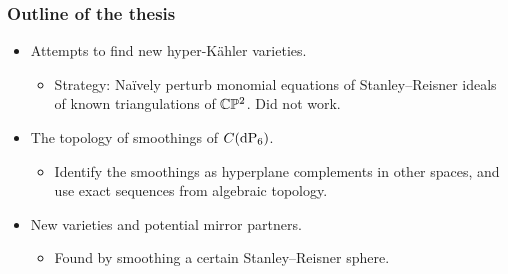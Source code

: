\begin{frame}
\frametitle{Outline of the thesis}

\begin{itemize}
    \item<1->
    Attempts to find new hyper-Kähler varieties.
    \begin{itemize}
        \item
	Strategy: Naïvely perturb monomial equations of Stanley--Reisner ideals of known triangulations of $\mathbb{C} \mathbb{P}^2$. \alert{Did not work.}
    \end{itemize}

    \item<2->
    The topology of smoothings of $C(\dP6)$.
    \begin{itemize}
        \item
        Identify the smoothings as hyperplane complements in other spaces, and use exact sequences from algebraic topology.
    \end{itemize}

    \item<3->
    New \CY varieties and potential mirror partners.
    \begin{itemize}
        \item
        Found by smoothing a certain Stanley--Reisner sphere.
    \end{itemize}
\end{itemize}

\end{frame}